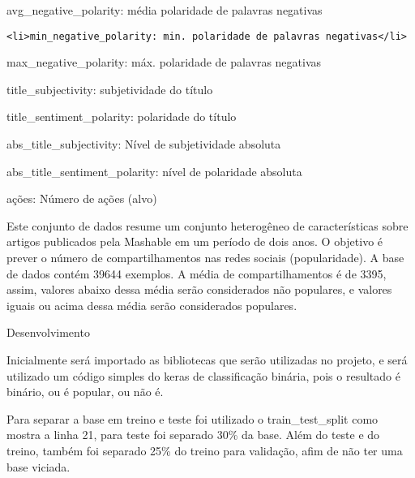 \documentclass[11pt]{article}
\begin{document}
avg\_negative\_polarity: média polaridade de palavras negativas

\begin{verbatim}
<li>min_negative_polarity: min. polaridade de palavras negativas</li>
\end{verbatim}

max\_negative\_polarity: máx. polaridade de palavras negativas

title\_subjectivity: subjetividade do título

title\_sentiment\_polarity: polaridade do título

abs\_title\_subjectivity: Nível de subjetividade absoluta

abs\_title\_sentiment\_polarity: nível de polaridade absoluta

ações: Número de ações (alvo)

Este conjunto de dados resume um conjunto heterogêneo de características
sobre artigos publicados pela Mashable em um período de dois anos. O
objetivo é prever o número de compartilhamentos nas redes sociais
(popularidade). A base de dados contém 39644 exemplos. A média de
compartilhamentos é de 3395, assim, valores abaixo dessa média serão
considerados não populares, e valores iguais ou acima dessa média serão
considerados populares.

Desenvolvimento

Inicialmente será importado as bibliotecas que serão utilizadas no
projeto, e será utilizado um código simples do keras de classificação
binária, pois o resultado é binário, ou é popular, ou não é.

Para separar a base em treino e teste foi utilizado o train\_test\_split
como mostra a linha 21, para teste foi separado 30\% da base. Além do
teste e do treino, também foi separado 25\% do treino para validação,
afim de não ter uma base viciada.
\end{document}
